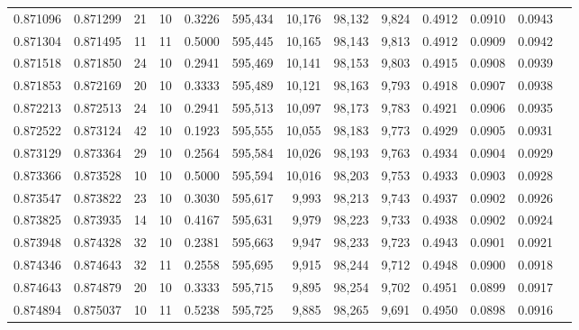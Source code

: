 \begin{tabular}{rrrrrrrrrrrrr}
0.871096 & 0.871299 &    21 &  10 &                                     0.3226 & 595,434 &  10,176 &  98,132 &   9,824 & 0.4912 & 0.0910 & 0.0943 \\
0.871304 & 0.871495 &    11 &  11 &                                     0.5000 & 595,445 &  10,165 &  98,143 &   9,813 & 0.4912 & 0.0909 & 0.0942 \\
0.871518 & 0.871850 &    24 &  10 &                                     0.2941 & 595,469 &  10,141 &  98,153 &   9,803 & 0.4915 & 0.0908 & 0.0939 \\
0.871853 & 0.872169 &    20 &  10 &                                     0.3333 & 595,489 &  10,121 &  98,163 &   9,793 & 0.4918 & 0.0907 & 0.0938 \\
0.872213 & 0.872513 &    24 &  10 &                                     0.2941 & 595,513 &  10,097 &  98,173 &   9,783 & 0.4921 & 0.0906 & 0.0935 \\
0.872522 & 0.873124 &    42 &  10 &                                     0.1923 & 595,555 &  10,055 &  98,183 &   9,773 & 0.4929 & 0.0905 & 0.0931 \\
0.873129 & 0.873364 &    29 &  10 &                                     0.2564 & 595,584 &  10,026 &  98,193 &   9,763 & 0.4934 & 0.0904 & 0.0929 \\
0.873366 & 0.873528 &    10 &  10 &                                     0.5000 & 595,594 &  10,016 &  98,203 &   9,753 & 0.4933 & 0.0903 & 0.0928 \\
0.873547 & 0.873822 &    23 &  10 &                                     0.3030 & 595,617 &   9,993 &  98,213 &   9,743 & 0.4937 & 0.0902 & 0.0926 \\
0.873825 & 0.873935 &    14 &  10 &                                     0.4167 & 595,631 &   9,979 &  98,223 &   9,733 & 0.4938 & 0.0902 & 0.0924 \\
0.873948 & 0.874328 &    32 &  10 &                                     0.2381 & 595,663 &   9,947 &  98,233 &   9,723 & 0.4943 & 0.0901 & 0.0921 \\
0.874346 & 0.874643 &    32 &  11 &                                     0.2558 & 595,695 &   9,915 &  98,244 &   9,712 & 0.4948 & 0.0900 & 0.0918 \\
0.874643 & 0.874879 &    20 &  10 &                                     0.3333 & 595,715 &   9,895 &  98,254 &   9,702 & 0.4951 & 0.0899 & 0.0917 \\
0.874894 & 0.875037 &    10 &  11 &                                     0.5238 & 595,725 &   9,885 &  98,265 &   9,691 & 0.4950 & 0.0898 & 0.0916 \\

\end{tabular}
